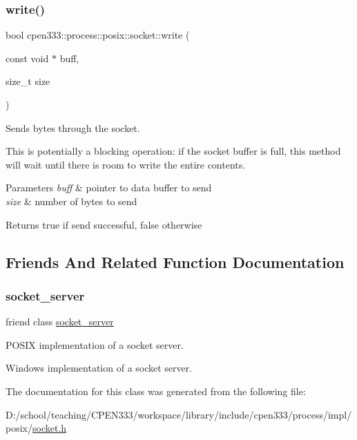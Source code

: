\subsubsection{\texorpdfstring{write()}{write()}\hspace{0.1cm}{\footnotesize\ttfamily [2/2]}}
{\footnotesize\ttfamily bool cpen333\+::process\+::posix\+::socket\+::write (\begin{DoxyParamCaption}\item[{const void $\ast$}]{buff,  }\item[{size\+\_\+t}]{size }\end{DoxyParamCaption})\hspace{0.3cm}{\ttfamily [inline]}}



Sends bytes through the socket. 

This is potentially a blocking operation\+: if the socket buffer is full, this method will wait until there is room to write the entire contents.


\begin{DoxyParams}{Parameters}
{\em buff} & pointer to data buffer to send \\
\hline
{\em size} & number of bytes to send \\
\hline
\end{DoxyParams}
\begin{DoxyReturn}{Returns}
true if send successful, false otherwise 
\end{DoxyReturn}


\subsection{Friends And Related Function Documentation}
\mbox{\label{classcpen333_1_1process_1_1posix_1_1socket_aba37c0ea463da9263b0712d3b3389066}} 
\subsubsection{\texorpdfstring{socket\+\_\+server}{socket\_server}}
{\footnotesize\ttfamily friend class \hyperlink{classcpen333_1_1process_1_1posix_1_1socket__server}{socket\+\_\+server}\hspace{0.3cm}{\ttfamily [friend]}}



P\+O\+S\+IX implementation of a socket server. 

Windows implementation of a socket server. 

The documentation for this class was generated from the following file\+:\begin{DoxyCompactItemize}
\item 
D\+:/school/teaching/\+C\+P\+E\+N333/workspace/library/include/cpen333/process/impl/posix/\hyperlink{impl_2posix_2socket_8h}{socket.\+h}\end{DoxyCompactItemize}
